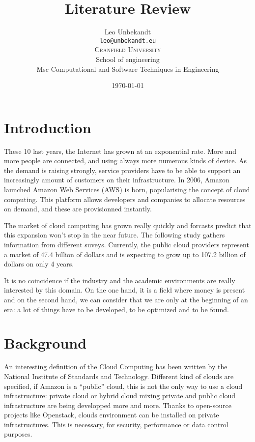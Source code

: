 \documentclass[a4paper,11pt]{article}
\author{Leo Unbekandt \\
 \texttt{leo@unbekandt.eu} \vspace{1em} \\
 \textsc{Cranfield University} \\
 School of engineering \\
 Msc Computational and Software Techniques in Engineering
}
\title{Literature Review}
\date{\today}
\begin{document}
\maketitle
\tableofcontents

\section*{Introduction}

These 10 last years, the Internet has grown at an exponential rate. More and
more people are connected, and using always more numerous kinds of device.
As the demand is raising strongly, service providers have to be able to support
an increasingly amount of customers on their infrastructure. In 2006, Amazon
launched Amazon Web Services (AWS) is born, popularising the concept of cloud
computing. This platform allows developers and companies to allocate resources
on demand, and these are provisionned instantly.

The market of cloud computing has grown really quickly and forcasts predict
that this expansion won't stop in the near future. The following study gathers
information from different suveys\cite{website:cloudcomputingmarket}.
Currently, the public cloud providers represent a market of 47.4 billion of
dollars and is expecting to grow up to 107.2 billion of dollars on only 4
years.

It is no coincidence if the industry and the academic environments are really
interested by this domain. On the one hand, it is a field where money is
present and on the second hand, we can consider that we are only at the
beginning of an era: a lot of things have to be developed, to be optimized and
to be found.

\section{Background}

An interesting definition of the Cloud Computing\cite{nistcloudcomputing} has
been written by the National Institute of Standards and Technology. Different
kind of clouds are specified, if Amazon is a ``public'' cloud, this is not the
only way to use a cloud infrastructure: private cloud or hybrid cloud mixing
private and public cloud infrastructure are being developped more and more.
Thanks to open-source projects like Openstack\cite{website:openstack}, clouds
environment can be installed on private infrastructures. This is necessary, for
security, performance or data control purposes.
\end{document}
